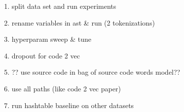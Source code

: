  \begin{enumerate}
   \item split data set and run experiments
   \item rename variables in ast \& run (2 tokenizations)
   \item hyperparam sweep \& tune
   \item dropout for code 2 vec
   \item ?? use source code in bag of source code words model??
   \item use all paths (like code 2 vec paper)
   \item run hashtable baseline on other datasets
 \end{enumerate}
 






